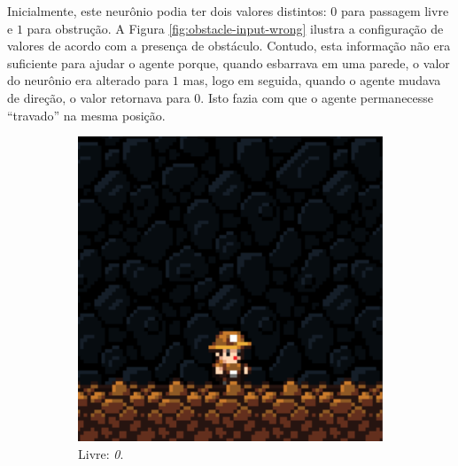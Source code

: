 Inicialmente, este neurônio podia ter dois valores distintos: $0$ para passagem
livre e $1$ para obstrução. A Figura \ref{fig:obstacle-input-wrong} ilustra a
configuração de valores de acordo com a presença de obstáculo. Contudo, esta
informação não era suficiente para ajudar o agente porque, quando esbarrava em
uma parede, o valor do neurônio era alterado para $1$ mas, logo em seguida,
quando o agente mudava de direção, o valor retornava para $0$. Isto fazia com
que o agente permanecesse ``travado'' na mesma posição.

\begin{figure}[H]
\centering
	\begin{subfigure}[b]{0.2\textwidth}
        \includegraphics[width=\textwidth]{fig/obstacle-3.pdf}
        \caption{Livre: \textit{0}.}
	\end{subfigure}
	\begin{subfigure}[b]{0.2\textwidth}

\end{subfigure}
\end{figure}
